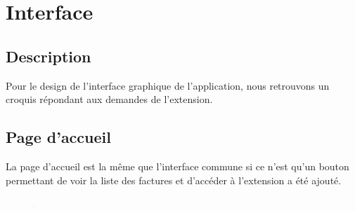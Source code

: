 \section{Interface}
\subsection{Description}

\begin{flushleft}
Pour le design de l'interface graphique de l'application, nous retrouvons un croquis répondant aux demandes de l'extension.
\end{flushleft}

\subsection{Page d'accueil}
\begin{flushleft}
La page d'accueil est la même que l'interface commune si ce n'est qu'un bouton permettant de voir la liste des factures et d'accéder à l'extension a été ajouté.
\end{flushleft}
\begin{figure}[h]
\centering
\includegraphics[width = 1]{extension-maxime/interface/img/home.png}
\end{figure}

